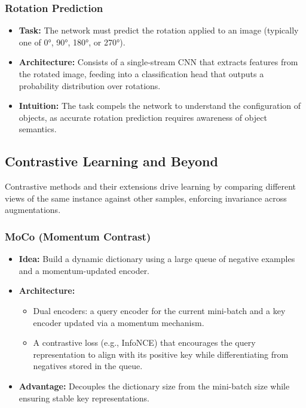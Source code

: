 \documentclass{article}
\begin{document}
\subsubsection{Rotation Prediction}
\begin{itemize}
    \item \textbf{Task:} The network must predict the rotation applied to an image (typically one of 0°, 90°, 180°, or 270°).
    \item \textbf{Architecture:} Consists of a single-stream CNN that extracts features from the rotated image, feeding into a classification head that outputs a probability distribution over rotations.
    \item \textbf{Intuition:} The task compels the network to understand the configuration of objects, as accurate rotation prediction requires awareness of object semantics.
\end{itemize}

\subsection{Contrastive Learning and Beyond}

Contrastive methods and their extensions drive learning by comparing different views of the same instance against other samples, enforcing invariance across augmentations.

\subsubsection{MoCo (Momentum Contrast)}
\begin{itemize}
    \item \textbf{Idea:} Build a dynamic dictionary using a large queue of negative examples and a momentum-updated encoder.
    \item \textbf{Architecture:} 
    \begin{itemize}
        \item Dual encoders: a query encoder for the current mini-batch and a key encoder updated via a momentum mechanism.
        \item A contrastive loss (e.g., InfoNCE) that encourages the query representation to align with its positive key while differentiating from negatives stored in the queue.
    \end{itemize}
    \item \textbf{Advantage:} Decouples the dictionary size from the mini-batch size while ensuring stable key representations.
\end{itemize}
\end{document}
